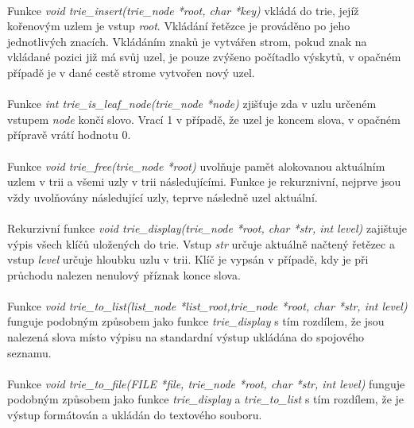 ﻿\documentclass[12pt, a4paper]{article}
\begin{document}
\paragraph{}
Funkce \textit{void trie\_insert(trie\_node *root, char *key)} vkládá do trie, jejíž kořenovým uzlem je vstup \textit{root}. Vkládání řetězce je prováděno po jeho jednotlivých znacích. Vkládáním znaků je vytvářen strom, pokud znak na vkládané pozici již má svůj uzel, je pouze zvýšeno počítadlo výskytů, v opačném případě je v dané cestě strome vytvořen nový uzel.

\paragraph{}
Funkce \textit{int trie\_is\_leaf\_node(trie\_node *node)} zjišťuje zda v uzlu určeném vstupem \textit{node} končí slovo. Vrací 1 v případě, že uzel je koncem slova, v opačném přípravě vrátí hodnotu 0.

\paragraph{}
Funkce \textit{void trie\_free(trie\_node *root)} uvolňuje pamět alokovanou aktuálním uzlem v trii a všemi uzly v trii následujícími. Funkce je rekurznivní, nejprve jsou vždy uvolňovány následující uzly, teprve následně uzel aktuální. 

\paragraph{}
Rekurzivní funkce \textit{void trie\_display(trie\_node *root, char *str, int level)} zajištuje výpis všech klíčů uložených do trie. Vstup \textit{str} určuje aktuálně načtený řetězec a vstup \textit{level} určuje hloubku uzlu v trii. Klíč je vypsán v případě, kdy je při průchodu nalezen nenulový příznak konce slova. 

\paragraph{}
Funkce \textit{void trie\_to\_list(list\_node *list\_root,trie\_node *root, char *str, int level)} funguje podobným způsobem jako funkce \textit{trie\_display} s tím rozdílem, že jsou nalezená slova místo výpisu na standardní výstup ukládána do spojového seznamu.

\paragraph{}
Funkce \textit{void trie\_to\_file(FILE *file, trie\_node *root, char *str, int level)} funguje podobným způsobem jako funkce \textit{trie\_display} a \textit{trie\_to\_list} s tím rozdílem, že je výstup formátován a ukládán do textového souboru.
\end{document}
